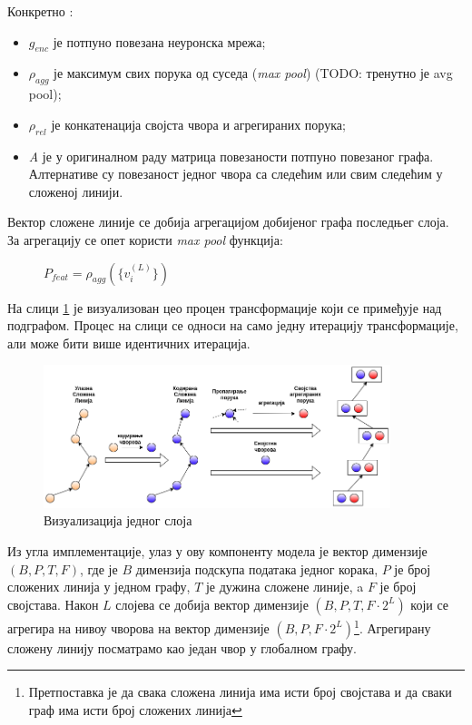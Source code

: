\documentclass[11pt,oneside]{memoir}
\begin{document}
\noindent Конкретно \cite{vectornet}:
\begin{itemize}
  \item $g_{enc}$ је потпуно повезана неуронска мрежа;
  \item $\rho_{agg}$ је максимум свих порука од суседа (\textit{max pool}) (TODO: тренутно је avg pool);
  \item $\rho_{rel}$ је конкатенација својста чвора и агрегираних порука;
  \item \textit{A} је у оригиналном раду матрица повезаности потпуно повезаног графа. Алтернативе су повезаност једног чвора са следећим 
  или свим следећим у сложеној линији. 
\end{itemize}

\noindent Вектор сложене линије се добија агрегацијом добијеног графа последњег слоја. За агрегацију се опет користи \textit{max pool} 
функција:

\begin{figure}[H]
  \centering
  $P_{feat} = \rho_{agg}(\{v^{(L)}_{i}\})$
\end{figure}

На слици \ref{vectornet-subgraph} је визуализован цео процен трансформације који се примеђује над подграфом. Процес на слици се односи на само
једну итерацију трансформације, али може бити више идентичних итерација.

\begin{figure}[H]
  \centering
  \includegraphics[width=0.9\textwidth]{images/vectornet-subgraph-rs.drawio.png}
  \caption{Визуализација једног слоја \label{vectornet-subgraph}}
\end{figure}

Из угла имплементације, улаз у ову компоненту модела је вектор димензије $(B, P, T, F)$, где је $B$ димензија подскупа података једног корака, 
$P$ је број сложених линија у једном графу, $T$ је дужина сложене линије, a $F$ је број својстава. Након $L$ слојева се добија вектор димензије 
$(B, P, T, F \cdot 2^{L})$ који се агрегира на нивоу чворова на вектор димензије
$(B, P, F \cdot 2^{L})$\footnote{Претпоставка је да свака сложена линија има исти број својстава и да сваки граф има исти број сложених линија}. 
Агрегирану сложену линију посматрамо као један чвор у глобалном графу.
         
\end{document}
